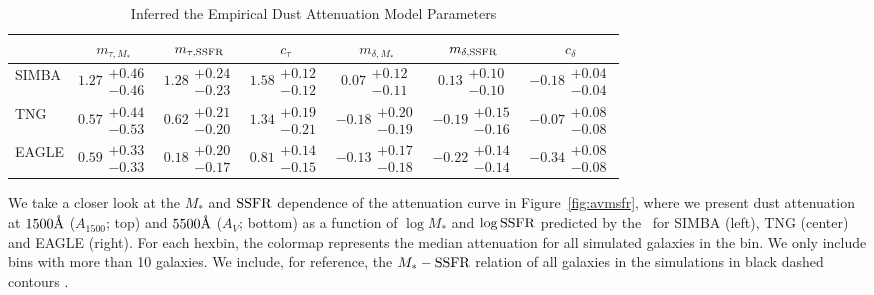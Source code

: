 \begin{table}
    \caption{Inferred the Empirical Dust Attenuation Model Parameters}
    \begin{tabular}{lcccccc} \toprule
        & $m_{\tau,M_*}$ & $m_{\tau,{\rm SSFR}}$ & $c_\tau$ & $m_{\delta,M_*}$ & $m_{\delta,{\rm SSFR}}$ & $c_\delta$ \\[3pt] \hline\hline
        SIMBA   & $1.27\substack{+0.46\\-0.46}$ &
        $1.28\substack{+0.24\\-0.23}$ & $1.58\substack{+0.12\\-0.12}$ &
        $0.07 \substack{+0.12\\-0.11}$ & $0.13 \substack{+0.10\\-0.10}$ &
        $-0.18\substack{+0.04\\-0.04}$ \\
        TNG     & $0.57\substack{+0.44\\-0.53}$ &
        $0.62\substack{+0.21\\-0.20}$ & $1.34\substack{+0.19\\-0.21}$ &
        $-0.18\substack{+0.20\\-0.19}$ & $-0.19\substack{+0.15\\-0.16}$ &
        $-0.07\substack{+0.08\\-0.08}$ \\
        EAGLE   & $0.59\substack{+0.33\\-0.33}$ &
        $0.18\substack{+0.20\\-0.17}$ & $0.81\substack{+0.14\\-0.15}$ &
        $-0.13\substack{+0.17\\-0.18}$ & $-0.22\substack{+0.14\\-0.14}$ &
        $-0.34\substack{+0.08\\-0.08}$\\
        \hline
    \end{tabular} \label{tab:posterior}
\end{table}

We take a closer look at the $M_*$ and ${\rm SSFR}$ dependence of the attenuation
curve in Figure~\ref{fig:avmsfr}, where we present dust attenuation at
$1500\AA$ ($A_{1500}$; top) and $5500\AA$
($A_V$; bottom) as a function of $\log M_*$ and $\log {\rm SSFR}$ predicted by the
\eda~for SIMBA (left), TNG (center) and EAGLE (right). 
For each hexbin, the colormap represents the median attenuation for all
simulated galaxies in the bin. 
We only include bins with more than 10 galaxies. 
We include, for reference, the $M_* - {\rm SSFR}$ relation of all galaxies in the
simulations in black dashed contours .

